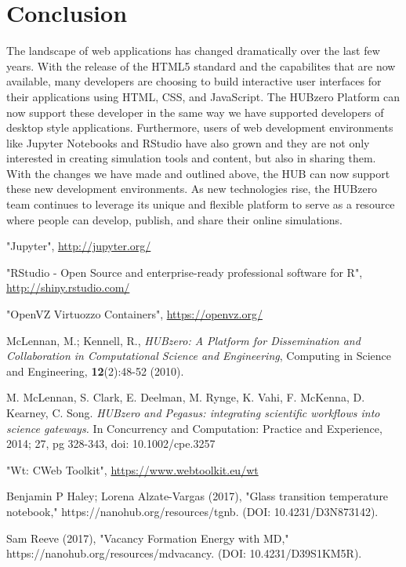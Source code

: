 \documentclass[conference]{../sty/IEEEtran}
\newcommand\CC{C\nolinebreak[4]\hspace{-.05em}\raisebox{.4ex}{\relsize{-3}{\textbf{++}}}\hspace{.25em}}
\begin{document}
\section{Conclusion}
The landscape of web applications has changed dramatically over the last few
years. With the release of the HTML5 standard and the capabilites that are now
available, many developers are choosing to build interactive user interfaces
for their applications using HTML, CSS, and JavaScript. The HUBzero Platform
can now support these developer in the same way we have supported developers of
desktop style applications. Furthermore, users of web development environments
like Jupyter Notebooks and RStudio have also grown and they are not only
interested in creating simulation tools and content, but also in sharing them.
With the changes we have made and outlined above, the HUB can now support these
new development environments.  As new technologies rise, the HUBzero team
continues to leverage its unique and flexible platform to serve as a resource
where people can develop, publish, and share their online simulations.




\begin{thebibliography}{1}

"Jupyter", \url{http://jupyter.org/}

"RStudio - Open Source and enterprise-ready professional software for R", \url{http://shiny.rstudio.com/}

"OpenVZ Virtuozzo Containers", \url{https://openvz.org/}

McLennan, M.; Kennell, R., \emph{HUBzero: A Platform for Dissemination
and Collaboration in Computational Science and Engineering}, Computing
in Science and Engineering, \textbf{12}(2):48-52 (2010).

M. McLennan, S. Clark, E. Deelman, M. Rynge, K. Vahi, F.
McKenna, D. Kearney, C. Song. \emph{HUBzero and Pegasus:
integrating scientific workflows into science gateways.} In
Concurrency and Computation: Practice and Experience,
2014; 27, pg 328-343, doi: 10.1002/cpe.3257

"Wt: \CC Web Toolkit", \url{https://www.webtoolkit.eu/wt}

Benjamin P Haley; Lorena Alzate-Vargas (2017), "Glass transition temperature notebook," https://nanohub.org/resources/tgnb. (DOI: 10.4231/D3N873142).

Sam Reeve (2017), "Vacancy Formation Energy with MD," https://nanohub.org/resources/mdvacancy. (DOI: 10.4231/D39S1KM5R).

\end{thebibliography}
\end{document}
